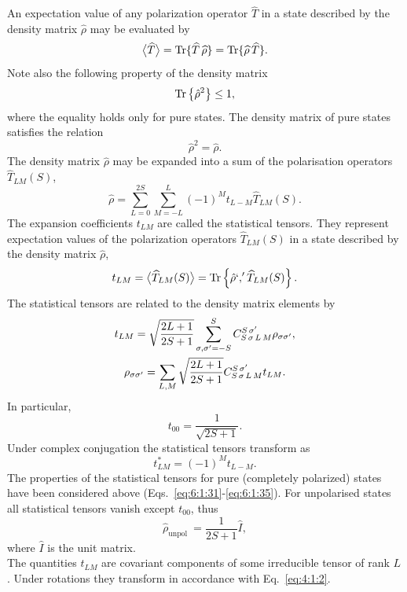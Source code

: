 An expectation value of any polarization operator $\widehat{T}$ in a state described by the density matrix $\widehat{\rho}$ may be evaluated by
\begin{equation}
\bigl\langle \widehat{T} \bigr\rangle=\operatorname{Tr} \{\widehat{T}\, \widehat{\rho}\}=\operatorname{Tr} \{\widehat{\rho}\, \widehat{T}\}. \label{eq:6:1:44}
\end{equation}
Note also the following property of the density matrix
\begin{equation}
\operatorname{Tr} \left\{\hat{\rho}^{2}\right\} \leq 1, \label{eq:6:1:45}
\end{equation}
where the equality holds only for pure states. The density matrix of pure states satisfies the relation
\begin{equation}
\hat{\rho}^{2}=\hat{\rho} . \label{eq:6:1:46}
\end{equation}
The density matrix $\hat{\rho}$ may be expanded into a sum of the polarisation operators $\hat{T}_{L M}(S)$,
\begin{equation}
\hat{\rho}=\sum_{L=0}^{2 S} \sum_{M=-L}^{L}(-1)^{M} t_{L-M} \hat{T}_{L M}(S) . \label{eq:6:1:47}
\end{equation}
The expansion coefficients $t_{L M}$ are called the statistical tensors. They represent expectation values of the polarization operators $\hat{T}_{L M}(S)$ in a state described by the density matrix $\hat{\rho}$,
\begin{equation}
t_{L M}=\bigl\langle \widehat{T}_{L M}(S) \bigr\rangle=\operatorname{Tr} \left\{\hat{\rho} `,'\widehat{T}_{L M}(S)\right\} . \label{eq:6:1:48}
\end{equation}
The statistical tensors are related to the density matrix elements by
\begin{gather}
t_{L M}=\sqrt{\frac{2 L+1}{2 S+1}} \sum_{\sigma, \sigma^{\prime}=-S}^{S} C_{S\,\sigma\,L\,M}^{S\,\sigma^{\prime}} \rho_{\sigma \sigma^{\prime}} , \label{eq:6:1:49}\\
\rho_{\sigma \sigma^{\prime}}=\sum_{L, M} \sqrt{\frac{2 L+1}{2 S+1}} C_{S\,\sigma\,L\,M}^{S\,\sigma^{\prime}} t_{L M}. \label{eq:6:1:50}
\end{gather}
In particular,
\begin{equation}
t_{00}=\frac{1}{\sqrt{2 S+1}} . \label{eq:6:1:51}
\end{equation}
Under complex conjugation the statistical tensors transform as
\[
t_{L M}^{*}=(-1)^{M} t_{L-M} .
\]
The properties of the statistical tensors for pure (completely polarized) states have been considered above (Eqs.~\eqref{eq:6:1:31}-\eqref{eq:6:1:35}). For unpolarised states all statistical tensors vanish except $t_{00}$, thus
\begin{equation}
\hat{\rho}_{\text {unpol }}=\frac{1}{2 S+1} \hat{I}, \label{eq:6:1:52}
\end{equation}
where $\widehat{I}$ is the unit matrix.\\
The quantities $t_{L M}$ are covariant components of some irreducible tensor of rank $L$. Under rotations they transform in accordance with Eq.~\eqref{eq:4:1:2}.

